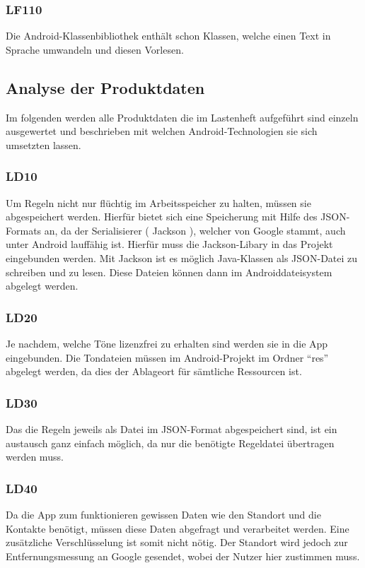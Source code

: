 \subsubsection{LF110}
Die Android-Klassenbibliothek enth\"alt schon Klassen, welche einen Text in Sprache umwandeln und diesen Vorlesen.

\subsection{Analyse der Produktdaten}
Im folgenden werden alle Produktdaten die im Lastenheft aufgef\"uhrt sind einzeln ausgewertet und beschrieben mit welchen Android-Technologien sie sich umsetzten lassen.

\subsubsection{LD10}
Um Regeln nicht nur fl\"uchtig im Arbeitsspeicher zu halten, m\"ussen sie abgespeichert werden. Hierf\"ur bietet sich eine Speicherung mit Hilfe des JSON-Formats an, da der Serialisierer ( Jackson ), welcher von Google stammt, auch unter Android lauff\"ahig ist. Hierf\"ur muss die Jackson-Libary in das Projekt eingebunden werden.
Mit Jackson ist es m\"oglich Java-Klassen als JSON-Datei zu schreiben und zu lesen. Diese Dateien k\"onnen dann im Androiddateisystem abgelegt werden.

\subsubsection{LD20}
Je nachdem, welche T\"one lizenzfrei zu erhalten sind werden sie in die App eingebunden. Die Tondateien m\"ussen im Android-Projekt im Ordner "`res"' abgelegt werden, da dies der Ablageort f\"ur s\"amtliche Ressourcen ist.

\subsubsection{LD30}
Das die Regeln jeweils als Datei im JSON-Format abgespeichert sind, ist ein austausch ganz einfach m\"oglich, da nur die ben\"otigte Regeldatei \"ubertragen werden muss.

\subsubsection{LD40}
Da die App zum funktionieren gewissen Daten wie den Standort und die Kontakte ben\"otigt, m\"ussen diese Daten abgefragt und verarbeitet werden. Eine zus\"atzliche Verschl\"usselung ist somit nicht n\"otig. Der Standort wird jedoch zur Entfernungsmessung an Google gesendet, wobei der Nutzer hier zustimmen muss.


